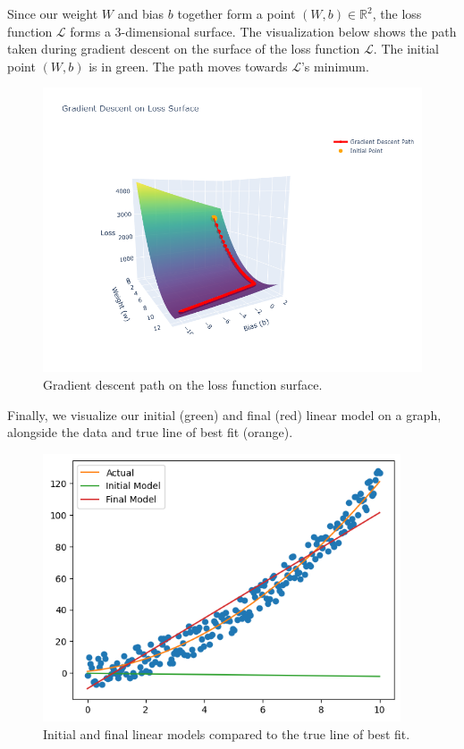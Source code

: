 Since our weight $W$ and bias $b$ together form a point $(W,b)\in\mathbb{R}^2$, the loss function $\mathcal{L}$ forms a 3-dimensional surface. The visualization below shows the path taken during gradient descent on the surface of the loss function $\mathcal{L}$. The initial point $(W,b)$ is in green. The path moves towards $\mathcal{L}$'s minimum.

\begin{figure}[H]
\centering
\includegraphics[width=400pt]{Regression/img/gradient-surface-plot-1.png}
\caption{Gradient descent path on the loss function surface.}
\label{fig:linear5}
\end{figure}

Finally, we visualize our initial (green) and final (red) linear model on a graph, alongside the data and true line of best fit (orange).

\begin{figure}[H]
\centering
\includegraphics[width=300pt]{Regression/img/output_19_0.png}
\caption{Initial and final linear models compared to the true line of best fit.}
\label{fig:linear6}
\end{figure}

%
